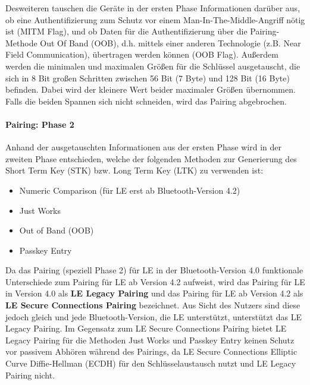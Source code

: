 
Desweiteren tauschen die Geräte in der ersten Phase Informationen darüber aus, ob eine Authentifizierung zum Schutz vor einem Man-In-The-Middle-Angriff nötig ist (MITM Flag), und ob Daten für die Authentifizierung über die Pairing-Methode Out Of Band (OOB), d.h. mittels einer anderen Technologie (z.B. Near Field Communication), übertragen werden können (OOB Flag). Außerdem werden die minimalen und maximalen Größen für die Schlüssel ausgetauscht, die sich in 8 Bit großen Schritten zwischen 56 Bit (7 Byte) und 128 Bit (16 Byte) befinden. Dabei wird der kleinere Wert beider maximaler Größen übernommen. Falls die beiden Spannen sich nicht schneiden, wird das Pairing abgebrochen.


\paragraph{Pairing: Phase 2}
Anhand der ausgetauschten Informationen aus der ersten Phase wird in der zweiten Phase entschieden, welche der folgenden Methoden zur Generierung des Short Term Key (STK) bzw. Long Term Key (LTK) zu verwenden ist:

\begin{itemize}
    \item{Numeric Comparison (für LE erst ab Bluetooth-Version 4.2)}
    \item{Just Works}
    \item{Out of Band (OOB)}
    \item{Passkey Entry}
\end{itemize}

Da das Pairing (speziell Phase 2) für LE in der Bluetooth-Version 4.0 funktionale Unterschiede zum Pairing für LE ab Version 4.2 aufweist, wird das Pairing für LE in Version 4.0 als \textbf{LE Legacy Pairing} und das Pairing für LE ab Version 4.2 als \textbf{LE Secure Connections Pairing} bezeichnet. Aus Sicht des Nutzers sind diese jedoch gleich und jede Bluetooth-Version, die LE unterstützt, unterstützt das LE Legacy Pairing. Im Gegensatz zum LE Secure Connections Pairing bietet LE Legacy Pairing für die Methoden Just Works und Passkey Entry keinen Schutz vor passivem Abhören während des Pairings, da LE Secure Connections Elliptic Curve Diffie-Hellman (ECDH) für den Schlüsselaustausch nutzt und LE Legacy Pairing nicht.\\\\

